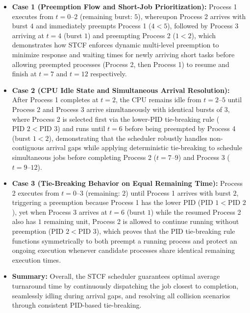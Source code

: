 \documentclass[11pt,a4paper]{article}
\begin{document}
\begin{itemize}[leftmargin=1.5em]
    \item \textbf{Case 1 (Preemption Flow and Short-Job Prioritization):} Process 1 executes from $t = 0\text{--}2$ (remaining burst: $5$), whereupon Process 2 arrives with burst $4$ and immediately preempts Process 1 ($4 < 5$), followed by Process 3 arriving at $t = 4$ (burst $1$) and preempting Process 2 ($1 < 2$), which demonstrates how STCF enforces dynamic multi-level preemption to minimize response and waiting times for newly arriving short tasks before allowing preempted processes (Process 2, then Process 1) to resume and finish at $t = 7$ and $t = 12$ respectively.
    \item \textbf{Case 2 (CPU Idle State and Simultaneous Arrival Resolution):} After Process 1 completes at $t = 2$, the CPU remains idle from $t = 2\text{--}5$ until Process 2 and Process 3 arrive simultaneously with identical bursts of $3$, where Process 2 is selected first via the lower-PID tie-breaking rule ($\text{PID } 2 < \text{PID } 3$) and runs until $t = 6$ before being preempted by Process 4 (burst $1 < 2$), demonstrating that the scheduler robustly handles non-contiguous arrival gaps while applying deterministic tie-breaking to schedule simultaneous jobs before completing Process 2 ($t = 7\text{--}9$) and Process 3 ($t = 9\text{--}12$).
    \item \textbf{Case 3 (Tie-Breaking Behavior on Equal Remaining Time):} Process 2 executes from $t = 0\text{--}3$ (remaining: $2$) until Process 1 arrives with burst $2$, triggering a preemption because Process 1 has the lower PID ($\text{PID } 1 < \text{PID } 2$), yet when Process 3 arrives at $t = 6$ (burst $1$) while the resumed Process 2 also has $1$ remaining unit, Process 2 is allowed to continue running without preemption ($\text{PID } 2 < \text{PID } 3$), which proves that the PID tie-breaking rule functions symmetrically to both preempt a running process and protect an ongoing execution whenever candidate processes share identical remaining execution times.
    \item \textbf{Summary:} Overall, the STCF scheduler guarantees optimal average turnaround time by continuously dispatching the job closest to completion, seamlessly idling during arrival gaps, and resolving all collision scenarios through consistent PID-based tie-breaking.
\end{itemize}
\end{document}

